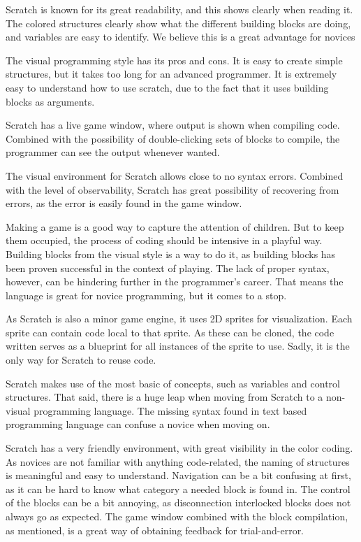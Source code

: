 \begin{description}[style=nextline]
\item[Readability] Scratch is known for its great readability, and this shows clearly when reading it. The colored structures clearly show what the different building blocks are doing, and variables are easy to identify. We believe this is a great advantage for novices
\item[Writability] The visual programming style has its pros and cons. It is easy to create simple structures, but it takes too long for an advanced programmer. It is extremely easy to understand how to use scratch, due to the fact that it uses building blocks as arguments.
\item[Observability] Scratch has a live game window, where output is shown when compiling code. Combined with the possibility of double-clicking sets of blocks to compile, the programmer can see the output whenever wanted.
\item[Trialability] The visual environment for Scratch allows close to no syntax errors. Combined with the level of observability, Scratch has great possibility of recovering from errors, as the error is easily found in the game window.
\item[Learnability] Making a game is a good way to capture the attention of children. But to keep them occupied, the process of coding should be intensive in a playful way. Building blocks from the visual style is a way to do it, as building blocks has been proven successful in the context of playing. The lack of proper syntax, however, can be hindering further in the programmer's career. That means the language is great for novice programming, but it comes to a stop.
\item[Reusability] As Scratch is also a minor game engine, it uses 2D sprites for visualization. Each sprite can contain code local to that sprite. As these can be cloned, the code written serves as a blueprint for all instances of the sprite to use. Sadly, it is the only way for Scratch to reuse code.
\item[Pedagogic Value] Scratch makes use of the most basic of concepts, such as variables and control structures. That said, there is a huge leap when moving from Scratch to a non-visual programming language. The missing syntax found in text based programming language can confuse a novice when moving on.
\item[Environment] Scratch has a very friendly environment, with great visibility in the color coding. As novices are not familiar with anything code-related, the naming of structures is meaningful and easy to understand. Navigation can be a bit confusing at first, as it can be hard to know what category a needed block is found in. The control of the blocks can be a bit annoying, as disconnection interlocked blocks does not always go as expected. The game window combined with the block compilation, as mentioned, is a great way of obtaining feedback for trial-and-error.

\end{description}
